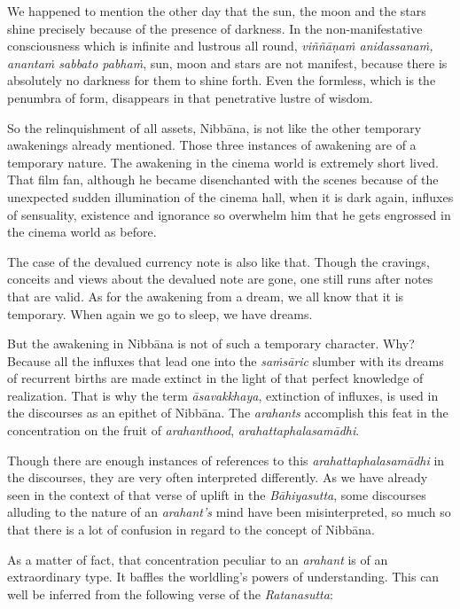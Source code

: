 We happened to mention the other day that the sun, the moon and the stars shine precisely because of the presence of darkness. In the non-manifestative consciousness which is infinite and lustrous all round, \emph{viññāṇaṁ anidassanaṁ, anantaṁ sabbato pabhaṁ}, sun, moon and stars are not manifest, because there is absolutely no darkness for them to shine forth. Even the formless, which is the penumbra of form, disappears in that penetrative lustre of wisdom.

So the relinquishment of all assets, Nibbāna, is not like the other temporary awakenings already mentioned. Those three instances of awakening are of a temporary nature. The awakening in the cinema world is extremely short lived. That film fan, although he became disenchanted with the scenes because of the unexpected sudden illumination of the cinema hall, when it is dark again, influxes of sensuality, existence and ignorance so overwhelm him that he gets engrossed in the cinema world as before.

The case of the devalued currency note is also like that. Though the cravings, conceits and views about the devalued note are gone, one still runs after notes that are valid. As for the awakening from a dream, we all know that it is temporary. When again we go to sleep, we have dreams.

But the awakening in Nibbāna is not of such a temporary character. Why? Because all the influxes that lead one into the \emph{saṁsāric} slumber with its dreams of recurrent births are made extinct in the light of that perfect knowledge of realization. That is why the term \emph{āsavakkhaya}, extinction of influxes, is used in the discourses as an epithet of Nibbāna. The \emph{arahants} accomplish this feat in the concentration on the fruit of \emph{arahanthood}, \emph{arahattaphalasamādhi}.

Though there are enough instances of references to this \emph{arahattaphalasamādhi} in the discourses, they are very often interpreted differently. As we have already seen in the context of that verse of uplift in the \emph{Bāhiyasutta}, some discourses alluding to the nature of an \emph{arahant's} mind have been misinterpreted, so much so that there is a lot of confusion in regard to the concept of Nibbāna.

As a matter of fact, that concentration peculiar to an \emph{arahant} is of an extraordinary type. It baffles the worldling's powers of understanding. This can well be inferred from the following verse of the \emph{Ratanasutta}:

